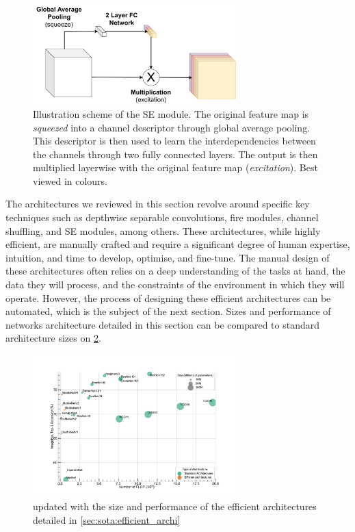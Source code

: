 
\begin{figure}[htbp]
  \centering
  \includegraphics[width=0.70\textwidth]{chapter_sota/assets/SE_module.pdf}
  \caption{Illustration scheme of the \acf{SE} module. The original feature
    map is \emph{squeezed} into a channel descriptor through global average
    pooling. This descriptor is then used to learn the interdependencies between
    the channels through two fully connected layers. The output is then
    multiplied layerwise with the original feature map (\emph{excitation}). Best
    viewed in colours.}
  \label{fig:sota:se_module}
\end{figure}


The architectures we reviewed in this section revolve around specific key
techniques such as depthwise separable convolutions, fire modules, channel
shuffling, and \ac{SE} modules, among others. These architectures, while highly
efficient, are manually crafted and require a significant degree of human
expertise, intuition, and time to develop, optimise, and fine-tune. The manual
design of these architectures often relies on a deep understanding of the tasks
at hand, the data they will process, and the constraints of the environment in
which they will operate. However, the process of designing these efficient
architectures can be automated, which is the subject of the next section. Sizes
and performance of networks architecture detailed in this section can be
compared to standard architecture sizes on \cref{fig:sota:net_sizes_std_eff}.\\

\begin{figure}[htbp]
  \centering
  \includegraphics[width=0.70\textwidth]{chapter_sota/assets/network_sizes_normal_eff.pdf}
  \caption{ updated with the size and performance of the efficient
    architectures detailed in \cref{sec:sota:efficient_archi}}
  \label{fig:sota:net_sizes_std_eff}
\end{figure}




